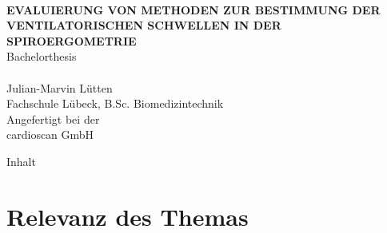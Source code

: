 \documentclass[colorBG,slideColor,8pt]{beamer}
\newcommand{\talktitle}{Evaluierung von Methoden zur Bestimmung der ventilatorischen Schwellen in der Spiroergometrie}
\begin{document}
\begin{frame}
    \vspace{-10ex}
    \textcolor{fhlred}{\HRuleFill[0.4ex]} \\ \vspace{1ex}
    {\linespread{1.5}\selectfont
    \MakeUppercase{\bf \huge \talktitle}\\[5.5ex]}
    \normalsize Bachelorthesis\\
    \textcolor{fhlred}{\HRuleFill[0.1ex]} \\ \vspace{4ex}
    \small Julian-Marvin Lütten\\
    \small Fachschule Lübeck, B.Sc. Biomedizintechnik\\
    \vspace{2ex}
    \small Angefertigt bei der\\
    \small cardioscan GmbH
\end{frame}

\begin{frame}{Inhalt}
\tableofcontents
\end{frame}


\section{Relevanz des Themas}
\begin{frame}
\tableofcontents[currentsection]
\end{frame}
\end{document}
